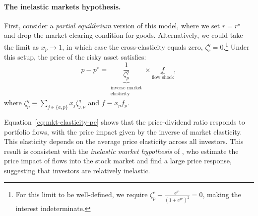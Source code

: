 





\paragraph{The inelastic markets hypothesis.} First, consider a \textit{partial equilibrium} version of this model, where we set $r = r^\star$ and drop the market clearing condition for goods. Alternatively, we could take the limit as $x_p \rightarrow 1$, in which case the cross-elasticity equals zero, $\zeta_r^q = 0$.\footnote{For this limit to be well-defined, we require $\zeta_p^c +\frac{e^{p^\star}}{(1+e^{p^\star})^2} = 0$, making the interest indeterminate.} Under this setup, the price of the risky asset satisfies:
\begin{equation}\label{eq:mkt-elasticity-pe}
    p - p^\star = \underbrace{\frac{1}{\zeta_p^q}}_{\substack{\text{inverse market}\\ \text{elasticity}}} \times \underbrace{f}_{\text{flow shock}},
\end{equation}
where $\zeta_p^q \equiv \sum_{j\in\{a,p\}} x_j \zeta_{j,p}^q$ and  $f \equiv x_p f_p$. 

Equation~\eqref{eq:mkt-elasticity-pe} shows that the price-dividend ratio responds to portfolio flows, with the price impact given by the inverse of market elasticity. 
This elasticity depends on the average price elasticity across all investors. 
This result is consistent with the \textit{inelastic market hypothesis} of \citet{gabaix2020search}, who estimate the price impact of flows into the stock market and find a large price response, suggesting that investors are relatively inelastic.  

